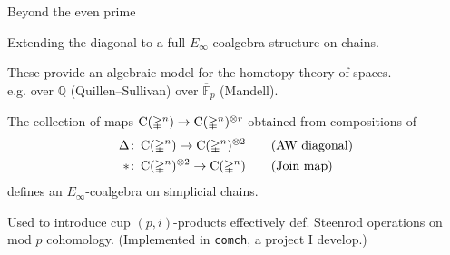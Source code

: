 
\begin{frame}[t]{Beyond the even prime}

	\pause

	Extending the diagonal to a full \textcolor{pblue}{$E_\infty$-coalgebra} structure on chains.

	\smallskip\pause

	These provide an algebraic model for the homotopy theory of spaces.\\ e.g. over $\mathbb Q$ (Quillen--Sullivan) over $\overline{\mathbb F}_p$ (Mandell).

	\smallskip\pause

	\begin{theorem}[Med.]
		The collection of maps $\operatorname{C}(\mathbb{\Delta}^n) \to \operatorname{C}(\mathbb{\Delta}^n)^{\otimes r}$ obtained from compositions of
		\begin{align*}
		\Delta &\colon \operatorname{C}(\mathbb{\Delta}^n) \to \operatorname{C}(\mathbb{\Delta}^n)^{\otimes 2}
		\qquad \text{(AW diagonal)} \\
		\ast &\colon \operatorname{C}(\mathbb{\Delta}^n)^{\otimes 2} \to \operatorname{C}(\mathbb{\Delta}^n)
		\qquad \text{(Join map)}
		\end{align*}
		defines an $E_\infty$-coalgebra on simplicial chains.
	\end{theorem}

	\pause {} \pause

	Used to introduce cup $(p,i)$-products effectively def. \textcolor{pblue}{Steenrod operations} on mod $p$ cohomology.
	\pause (Implemented in \texttt{comch}, a project I develop.)

	\smallskip\pause

\end{frame}

